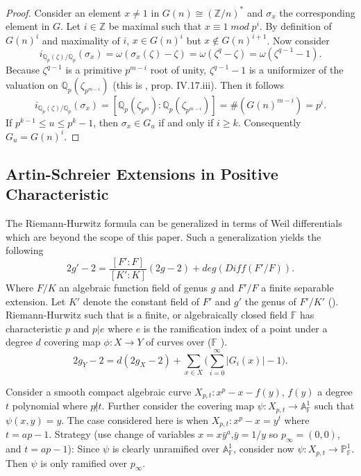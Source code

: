 \documentclass[paper=a4, fontsize=11pt]{scrartcl} %
\numberwithin{equation}{section} %
\numberwithin{figure}{section} %
\numberwithin{table}{section} %
\theoremstyle{break}
\begin{document}
\begin{proof}
Consider an element $x\not=1$ in $G(n)\cong (\mathbb{Z}/n)^*$ and $\sigma_x$ the corresponding element in $G$. Let $i\in\mathbb{Z}$ be maximal such that $x \equiv 1 \; mod\;p^i$. By definition of $G(n)^i$ and maximality of $i$, $x\in G(n)^i$ but $x\not\in G(n)^{i+1}$. Now consider
$$
i_{\mathbb{Q}_p(\zeta)/\mathbb{Q}_p}(\sigma_x) = \omega(\sigma_x(\zeta)-\zeta) = \omega(\zeta^q-\zeta)=\omega(\zeta^{q-1}-1).
$$
Because $\zeta^{q-1}$ is a primitive $p^{m-i}$ root of unity, $\zeta^{q-1}-1$ is a uniformizer of the valuation on $\mathbb{Q}_p(\zeta_{p^{m-i}})$ (this is \cite{Serre}, prop. IV.17.iii). Then it follows
$$
i_{\mathbb{Q}_p(\zeta)/\mathbb{Q}_p}(\sigma_x) = [\mathbb{Q}_p(\zeta_{p^{m}}):\mathbb{Q}_p(\zeta_{p^{m-i}})]=\#(G(n)^{m-i})=p^i.
$$
If $p^{k-1} \leq u \leq p^k -1$, then $\sigma_x\in G_u$ if and only if $i\geq k$. Consequently $G_u = G(n)^i$.
\end{proof}

\subsection{Artin-Schreier Extensions in Positive Characteristic}
The Riemann-Hurwitz formula can be generalized in terms of Weil differentials which are beyond the scope of this paper. Such a generalization yields the following
$$
2g'-2=\frac{[F':F]}{[K':K]}(2g-2) + deg(Diff(F'/F)).
$$
Where $F/K$ an algebraic function field of genus $g$ and $F'/F$ a finite separable extension. Let $K'$ denote the constant field of $F'$ and $g'$ the genus of $F'/K'$ (\cite{stitchenoth}).
Riemann-Hurwitz such that is a finite, or algebraically closed field $\mathbb{F}$ has characteristic $p$ and $p|e$ where $e$ is the ramification index of a point under a degree $d$ covering map $\phi:X \to Y$ of curves over ($\mathbb{F}$ \cite{RnR}). 
$$
2g_Y -2 = d(2g_X -2) + \sum_{x\in X} \big( \sum^{\infty}_{i=0}|G_i(x)| -1 \big).
$$

Consider a smooth compact algebraic curve $X_{p,t}: x^p - x - f(y)$, $f(y)$ a degree $t$ polynomial where $p\not|t$. Further consider the covering map $\psi: X_{p,t} \to \mathbb{A}^1_\mathbb{F}$ such that $\psi(x,y)=y$. 
The case considered here is when $X_{p,t}: x^p-x = y^t$ where $t=ap-1$.
Strategy (use change of variables $x=x\bar{y}^a$,$\bar{y}=1/y$ so $p_\infty = (0,0)$, and $t=ap-1$):
Since $\psi$ is clearly unramified over $\mathbb{A}^1_\mathbb{F}$, consider now $\psi: X_{p,t} \to \mathbb{P}^1_\mathbb{F}$. Then $\psi$ is only ramified over $p_\infty$. 
\end{document}
